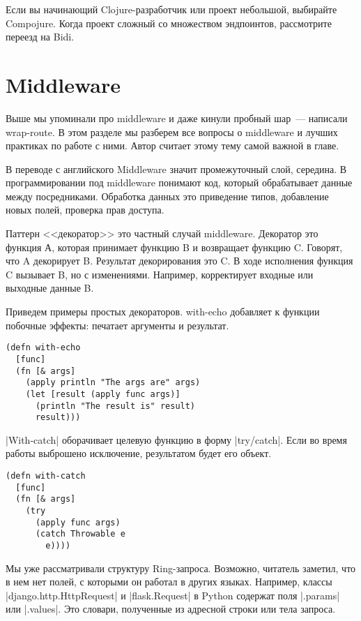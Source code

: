 Если вы начинающий Clojure-разработчик или проект небольшой, выбирайте
Compojure. Когда проект сложный со множеством эндпоинтов, рассмотрите переезд на
Bidi.

\section{Middleware}

Выше мы упоминали про middleware и даже кинули пробный шар~--- написали
wrap-route. В этом разделе мы разберем все вопросы о middleware и лучших
практиках по работе с ними. Автор считает этому тему самой важной в главе.

В переводе с английского Middleware значит промежуточный слой, середина. В
программировании под middleware понимают код, который обрабатывает данные между
посредниками. Обработка данных это приведение типов, добавление новых полей,
проверка прав доступа.

Паттерн <<декоратор>> это частный случай middleware. Декоратор это функция А,
которая принимает функцию B и возвращает функцию C. Говорят, что A декорирует
B. Результат декорирования это C. В ходе исполнения функция C вызывает B, но с
изменениями. Например, корректирует входные или выходные данные B.

Приведем примеры простых декораторов. with-echo добавляет к функции побочные
эффекты: печатает аргументы и результат.

\begin{verbatim}
(defn with-echo
  [func]
  (fn [& args]
    (apply println "The args are" args)
    (let [result (apply func args)]
      (println "The result is" result)
      result)))
\end{verbatim}

\spverb|With-catch| оборачивает целевую функцию в форму \spverb|try/catch|. Если во время
работы выброшено исключение, результатом будет его объект.

\begin{verbatim}
(defn with-catch
  [func]
  (fn [& args]
    (try
      (apply func args)
      (catch Throwable e
        e))))
\end{verbatim}

Мы уже рассматривали структуру Ring-запроса. Возможно, читатель заметил, что в
нем нет полей, с которыми он работал в других языках. Например, классы
\spverb|django.http.HttpRequest| и \spverb|flask.Request| в Python содержат поля \spverb|.params| или
\spverb|.values|. Это словари, полученные из адресной строки или тела запроса.

